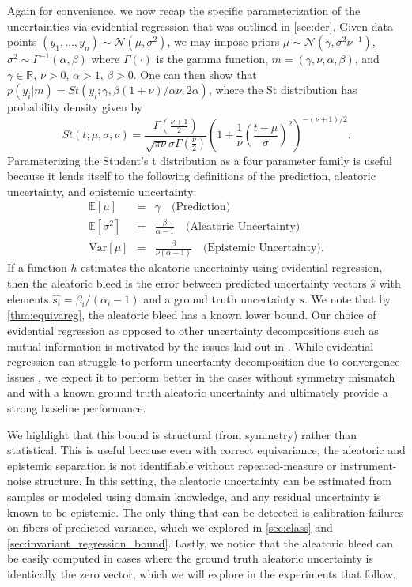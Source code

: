 \documentclass[10pt]{article} %
\theoremstyle{definition}
\begin{document}
Again for convenience, we now recap the specific parameterization of the uncertainties via evidential regression that was outlined in \cref{sec:der}. Given data points $\left(y_1, \hdots, y_n\right) \sim \mathcal{N}(\mu, \sigma^2)$, we may impose priors $\mu  \sim  \mathcal{N}(\gamma, \sigma^2\nu^{-1})$, $
\sigma^2  \sim  \Gamma^{-1} (\alpha , \beta)$ where $\Gamma(\cdot)$ is the gamma function, $m = (\gamma, \nu, \alpha, \beta)$, and $\gamma \in \mathbb{R}$, $\nu > 0$, $\alpha > 1$, $\beta > 0$. One can then show that $p(y_i | m) = St(y_i ; \gamma, \beta (1 + \nu)/\alpha \nu, 2\alpha )$, where the St distribution has probability density given by $$St(t; \mu, \sigma, \nu) = \frac{\Gamma \left(\frac{\nu + 1}{2}\right)}{\sqrt{\pi \nu}\sigma\Gamma\left(\frac{\nu}{2}\right)} \left( 1 + \frac{1}{\nu}\left(\frac{t - \mu}{\sigma}\right)^2\right)^{-(\nu + 1)/2}.$$ Parameterizing the Student's t distribution as a four parameter family is useful because it lends itself to the following definitions of the prediction, aleatoric uncertainty, and epistemic uncertainty:
%
\begin{eqnarray*}
    \mathbb{E}[\mu] &=& \gamma \quad \text{(Prediction)}\\
    \mathbb{E}[\sigma^2] &=& \frac{\beta}{\alpha - 1} \quad \text{(Aleatoric Uncertainty)} \\
    \text{Var}[\mu] &=& \frac{\beta}{\nu(\alpha - 1)} \quad \text{(Epistemic Uncertainty)}.
\end{eqnarray*}
%
If a function $h$ estimates the aleatoric uncertainty using evidential regression, then the aleatoric bleed is the error between predicted uncertainty vectors $\hat{s}$ with elements $\hat{s_i} = \beta_i/(\alpha_i - 1)$ and a ground truth uncertainty $s$. We note that by \cref{thm:equivareg}, the aleatoric bleed has a known lower bound. Our choice of evidential regression as opposed to other uncertainty decompositions such as mutual information is motivated by the issues laid out in \cite{wimmer2023quantifying}. While evidential regression can struggle to perform uncertainty decomposition due to convergence issues \citep{bengs2022pitfalls, meinert2023unreasonable, jurgens2024epistemic}, we expect it to perform better in the cases without symmetry mismatch and with a known ground truth aleatoric uncertainty and ultimately provide a strong baseline performance.

We highlight that this bound is structural (from symmetry) rather than statistical. This is useful because even with correct equivariance, the aleatoric and epistemic separation is not identifiable without repeated-measure or instrument-noise structure. In this setting, the aleatoric uncertainty can be estimated from samples or modeled using domain knowledge, and any residual uncertainty is known to be epistemic. The only thing that can be detected is calibration failures on fibers of predicted variance, which we explored in \cref{sec:class} and \cref{sec:invariant_regression_bound}. Lastly, we notice that the aleatoric bleed can be easily computed in cases where the ground truth aleatoric uncertainty is identically the zero vector, which we will explore in the experiments that follow.
\end{document}
